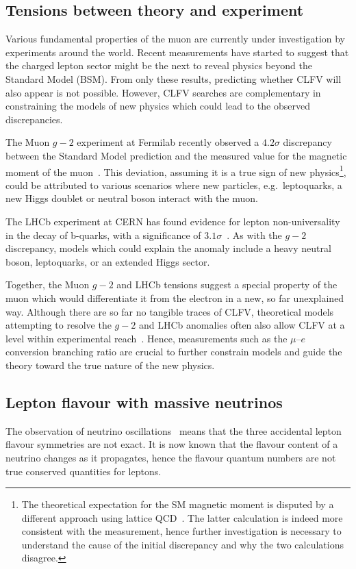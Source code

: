 \subsection{Tensions between theory and experiment}
Various fundamental properties of the muon are currently under investigation by
experiments around the world. Recent measurements have started to suggest that
the charged lepton sector might be the next to reveal physics beyond the
Standard Model (BSM). From only these results, predicting whether CLFV will also
appear is not possible. However, CLFV searches are complementary in constraining
the models of new physics which could lead to the observed discrepancies.

The Muon $g-2$ experiment at Fermilab recently observed a $4.2\sigma$
discrepancy between the Standard Model prediction and the measured value for the
magnetic moment of the muon~\cite{PhysRevLett.126.141801}. This deviation,
assuming it is a true sign of new physics\footnote{
    The theoretical expectation for the SM magnetic moment is disputed by a
    different approach using lattice QCD~\cite{Borsanyi2021}. The latter calculation
    is indeed more consistent with the measurement, hence further investigation is
    necessary to understand the cause of the initial discrepancy and why the two
    calculations disagree.
}, could be attributed to various scenarios where new particles, e.g.\ 
leptoquarks, a new Higgs doublet or neutral boson interact with the muon.


The LHCb experiment at CERN has found evidence for lepton non-universality in
the decay of b-quarks, with a significance of $3.1\sigma$~\cite{Aaij2022}. As
with the $g-2$ discrepancy, models which could explain the anomaly include a
heavy neutral boson, leptoquarks, or an extended Higgs sector. 

Together, the Muon $g-2$ and LHCb tensions suggest a special property of the
muon which would differentiate it from the electron in a new, so far unexplained
way. Although there are so far no tangible traces of CLFV, theoretical models
attempting to resolve the $g-2$ and LHCb anomalies often also allow CLFV at a
level within experimental reach~\cite{DEGOUVEA201375, PhysRevD.101.115016,
PhysRevD.100.115010}. Hence, measurements such as the $\mu$--$e$ conversion
branching ratio are crucial to further constrain models and guide the theory
toward the true nature of the new physics.


\subsection{Lepton flavour with massive neutrinos}
The observation of neutrino oscillations~\cite{PhysRevLett.81.1562} means that
the three accidental lepton flavour symmetries are not exact. It is now known
that the flavour content of a neutrino changes as it propagates, hence the
flavour quantum numbers are not true conserved quantities for leptons. 


